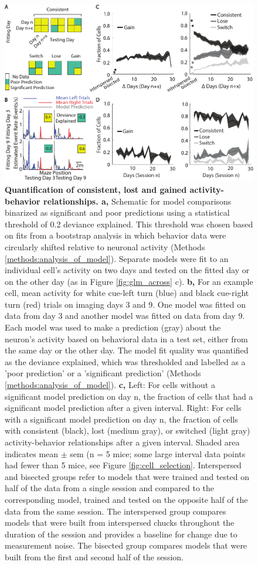 \begin{figure}
\includegraphics[width=\textwidth]{figures/4_glm_across_population.pdf}
\caption[Quantification of consistent, lost and gained activity-behavior relationships.]{\textbf{Quantification of consistent, lost and gained activity-behavior relationships. a,} Schematic for model comparisons binarized as significant and poor predictions using a statistical threshold of 0.2 deviance explained. This threshold was chosen based on fits from a bootstrap analysis in which behavior data were circularly shifted relative to neuronal activity (Methods \ref{methods:analysis_of_model}). Separate models were fit to an individual cell's activity on two days and tested on the fitted day or on the other day (as in Figure \ref{fig:glm_across} c). 
%
\textbf{b,} For an example cell, mean activity for white cue-left turn (blue) and black cue-right turn (red) trials on imaging days 3 and 9. One model was fitted on data from day 3 and another model was fitted on data from day 9. Each model was used to make a prediction (gray) about the neuron's activity based on behavioral data in a test set, either from the same day or the other day. The model fit quality was quantified as the deviance explained, which was thresholded and labelled as a 'poor prediction' or a 'significant prediction' (Methods \ref{methods:analysis_of_model}).
%
\textbf{c,} Left: For cells without a significant model prediction on day n, the fraction of cells that had a significant model prediction after a given interval. Right: For cells with a significant model prediction on day n, the fraction of cells with consistent (black), lost (medium gray), or switched (light gray) activity-behavior relationships after a given interval. Shaded area indicates mean $\pm$ sem (n = 5 mice; some large interval data points had fewer than 5 mice, see Figure \ref{fig:cell_selection}. Interspersed and bisected groups refer to models that were trained and tested on half of the data from a single session and compared to the corresponding model, trained and tested on the opposite half of the data from the same session. The interspersed group compares models that were built from interspersed chucks throughout the duration of the session and provides a baseline for change due to measurement noise. The bisected group compares models that were built from the first and second half of the session.
}
\end{figure}
